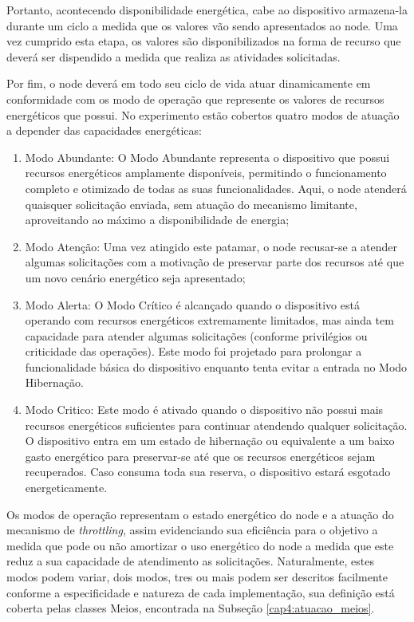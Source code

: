 Portanto, acontecendo disponibilidade energética, cabe ao dispositivo armazena-la durante um ciclo a medida que os valores vão sendo apresentados ao node. Uma vez cumprido esta etapa, os valores são disponibilizados na forma de recurso que deverá ser dispendido a medida que realiza as atividades solicitadas.

Por fim, o node deverá em todo seu ciclo de vida atuar dinamicamente em conformidade com os modo de operação que represente os valores de recursos energéticos que possui. No experimento estão cobertos quatro modos de atuação a depender das capacidades energéticas:

\begin{enumerate}	
\item Modo Abundante: O Modo Abundante representa o dispositivo que possui recursos energéticos amplamente disponíveis, permitindo o funcionamento completo e otimizado de todas as suas funcionalidades. Aqui, o node atenderá quaisquer solicitação enviada, sem atuação do mecanismo limitante, aproveitando ao máximo a disponibilidade de energia;
\item Modo Atenção: Uma vez atingido este patamar, o node recusar-se a atender algumas solicitações com a motivação de preservar parte dos recursos até que um novo cenário energético seja apresentado;
\item Modo Alerta: O Modo Crítico é alcançado quando o dispositivo está operando com recursos energéticos extremamente limitados, mas ainda tem capacidade para atender algumas solicitações (conforme privilégios ou criticidade das operações). Este modo foi projetado para prolongar a funcionalidade básica do dispositivo enquanto tenta evitar a entrada no Modo Hibernação. 
\item Modo Critico: Este modo é ativado quando o dispositivo não possui mais recursos energéticos suficientes para continuar atendendo qualquer solicitação. O dispositivo entra em um estado de hibernação ou equivalente a um baixo gasto energético para preservar-se até que os recursos energéticos sejam recuperados. Caso consuma toda sua reserva, o dispositivo estará esgotado energeticamente.
\end{enumerate}


Os modos de operação representam o estado energético do node e a atuação do mecanismo de \textit{throttling}, assim evidenciando sua eficiência para o objetivo a medida que pode ou não amortizar o uso energético do node a medida que este reduz a sua capacidade de atendimento as solicitações. Naturalmente, estes modos podem variar, dois modos, tres ou mais podem ser descritos facilmente conforme a especificidade e natureza de cada implementação, sua definição está coberta pelas classes Meios, encontrada na Subseção \ref{cap4:atuacao_meios}.

